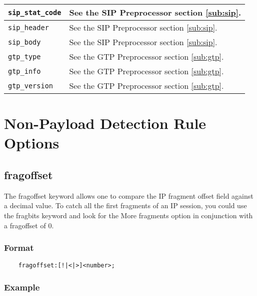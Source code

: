 \documentclass[english]{report}
\begin{document}
\begin{center}
\begin{longtable}[h]{| p{1in} | p{4.5in} |}
\hline
\texttt{sip\_stat\_code} &

See the SIP Preprocessor section \ref{sub:sip}.\\

\hline
\texttt{sip\_header} &

See the SIP Preprocessor section \ref{sub:sip}.\\

\hline
\texttt{sip\_body} &

See the SIP Preprocessor section \ref{sub:sip}.\\

\hline
\texttt{gtp\_type} &

See the GTP Preprocessor section \ref{sub:gtp}.\\

\hline
\texttt{gtp\_info} &

See the GTP Preprocessor section \ref{sub:gtp}.\\

\hline
\texttt{gtp\_version} &

See the GTP Preprocessor section \ref{sub:gtp}.\\

\hline
\end{longtable}
\end{center}

\section{Non-Payload Detection Rule Options}
\subsection{fragoffset}
\label{fragoffset section}

The fragoffset keyword allows one to compare the IP fragment offset field
against a decimal value. To catch all the first fragments of an IP session, you
could use the fragbits keyword and look for the More fragments option in
conjunction with a fragoffset of 0.

\subsubsection{Format}

\begin{verbatim}
    fragoffset:[!|<|>]<number>;
\end{verbatim}

\subsubsection{Example}
\end{document}
